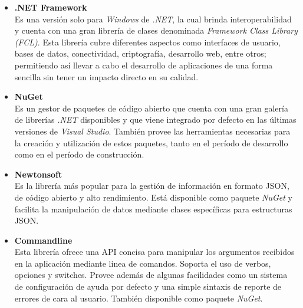             \begin{itemize}
                \item \textbf{.NET Framework} \\
                Es una versión solo para \textit{Windows} de \textit{.NET}, la cual brinda interoperabilidad y cuenta con una gran librería de clases denominada \textit{Framework Class Library (FCL)}. Esta librería cubre diferentes aspectos como interfaces de usuario, bases de datos, conectividad, criptografía, desarrollo web, entre otros; permitiendo así llevar a cabo el desarrollo de aplicaciones de una forma sencilla sin tener un impacto directo en su calidad. \cite{netframework}
                
                \item \textbf{NuGet} \\
                Es un gestor de paquetes de código abierto que cuenta con una gran galería de librerías \textit{.NET} disponibles y que viene integrado por defecto en las últimas versiones de \textit{Visual Studio}. También provee las herramientas necesarias para la creación y utilización de estos paquetes, tanto en el período de desarrollo como en el período de construcción. \cite{nuget1} \cite{nuget2}

                \item \textbf{Newtonsoft} \\
                    Es la librería más popular para la gestión de información en formato JSON, de código abierto y alto rendimiento. Está disponible como paquete \textit{NuGet} y facilita la manipulación de datos mediante clases específicas para estructuras JSON. \cite{newtonsoft}

                \item \textbf{Commandline} \\
                    Esta librería ofrece una API concisa para manipular los argumentos recibidos en la aplicación mediante linea de comandos. Soporta el uso de verbos, opciones y switches. Provee además de algunas facilidades como un sistema de configuración de ayuda por defecto y una simple sintaxis de reporte de errores de cara al usuario. También disponible como paquete \textit{NuGet}. \cite{commandline1} \cite{commandline2}
                    

\end{itemize}
